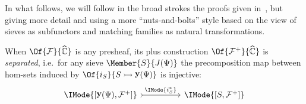 \documentclass{article}
\DeclareMathOperator\OpYoneda{\mathbf{y}}
\newcommand\Yoneda[1]{\OpYoneda({#1})}
\newcommand\Psh[1]{\widehat{#1}}
\newcommand\Plus[1]{{#1}^+}
\begin{document}
In what follows, we will follow in the broad strokes the proofs given
in~\cite{maclane-moerdijk:1992}, but giving more detail and using a
more ``nuts-and-bolts'' style based on the view of sieves as
subfunctors and matching families as natural transformations.

\begin{thm}\label{thm:plus-separated}
  When $\Of{\mathcal{F}}{\Psh{\mathbb{C}}}$ is any presheaf, its plus
  construction $\Of{\Plus{\mathcal{F}}}{\Psh{\mathbb{C}}}$ is \emph{separated},
  i.e.\ for any sieve $\Member{S}{J(\Psi)}$ the precomposition map
  between hom-sets induced by
  $\Of{i_S}{S\rightarrowtail\Yoneda{\Psi}}$ is injective:
  \[
    \begin{tikzcd}[sep=huge]
      \IMode{[\Yoneda{\Psi},\Plus{\mathcal{F}}]}
      \arrow[r,tail,"\IMode{i_S^*}"]
      &
      \IMode{[S,\Plus{\mathcal{F}}]}
    \end{tikzcd}
  \]
\end{thm}
\end{document}
